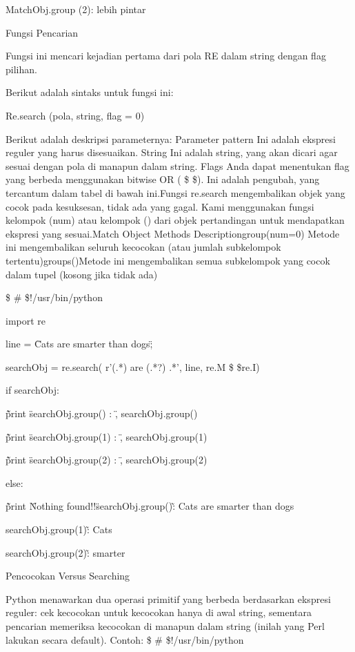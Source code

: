 \begin {enumerate}
\begin {enumerate}
MatchObj.group (2): lebih pintar

Fungsi Pencarian

Fungsi ini mencari kejadian pertama dari pola RE dalam string dengan flag pilihan.

Berikut adalah sintaks untuk fungsi ini:

Re.search (pola, string, flag = 0)

Berikut adalah deskripsi parameternya:
Parameter pattern Ini adalah ekspresi reguler yang harus disesuaikan. String Ini adalah string, yang akan dicari agar sesuai dengan pola di manapun dalam string. Flags Anda dapat menentukan flag yang berbeda menggunakan bitwise OR ( \$    \$). Ini adalah pengubah, yang tercantum dalam tabel di bawah ini.Fungsi re.search mengembalikan objek yang cocok pada kesuksesan, tidak ada yang gagal. Kami menggunakan fungsi kelompok (num) atau kelompok () dari objek pertandingan untuk mendapatkan ekspresi yang sesuai.Match Object Methods Descriptiongroup(num=0) Metode ini mengembalikan seluruh kecocokan (atau jumlah subkelompok tertentu)groups()Metode ini mengembalikan semua subkelompok yang cocok dalam tupel (kosong jika tidak ada)

 \$  \#  \$!/usr/bin/python

import re

line = \"Cats are smarter than dogs\";

searchObj = re.search( r'(.*) are (.*?) .*', line, re.M \$    \$re.I)

if searchObj:

\~\~ print \"searchObj.group() : \", searchObj.group()

\~\~ print \"searchObj.group(1) : \", searchObj.group(1)

\~\~ print \"searchObj.group(2) : \", searchObj.group(2)

else:

\~\~ print \"Nothing found!!\"

searchObj.group()\~:  Cats are smarter than dogs

searchObj.group(1)\~:  Cats

searchObj.group(2)\~:  smarter

Pencocokan Versus Searching

Python menawarkan dua operasi primitif yang berbeda berdasarkan ekspresi reguler: cek kecocokan untuk kecocokan hanya di awal string, sementara pencarian memeriksa kecocokan di manapun dalam string (inilah yang Perl lakukan secara default).
Contoh:
 \$  \#  \$!/usr/bin/python


\end{enumerate}
\end{enumerate}
